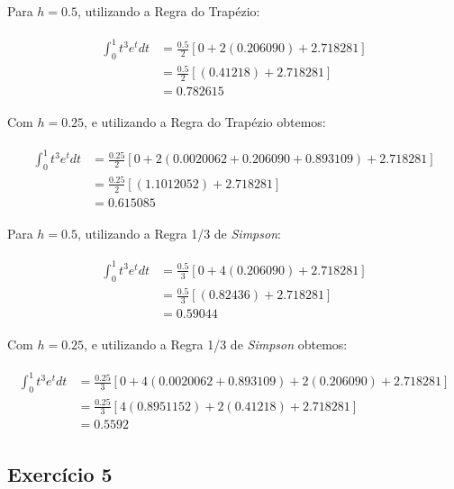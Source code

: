 \documentclass[paper=a4, fontsize=12pt]{scrartcl}
\numberwithin{equation}{section} %
\numberwithin{figure}{section} %
\numberwithin{table}{section} %
\newcommand{\euler}{e}
\begin{document}
		Para $h = 0.5$, utilizando a Regra do Trapézio:


		\begin{align*}
			\begin{split}
				\int_{0}^{1} t^{3}\euler^{t} dt &= \frac{0.5}{2}\left[0 + 2(0.206090) + 2.718281 \right]\\ &=  \frac{0.5}{2}\left[(0.41218) + 2.718281 \right] \\
				&= 0.782615
			\end{split}
		\end{align*}

		Com $h = 0.25$, e utilizando a Regra do Trapézio obtemos:

		\begin{align*}
			\begin{split}
				\int_{0}^{1} t^{3}\euler^{t} dt &= \frac{0.25}{2}\left[0 + 2(0.0020062 + 0.206090 + 0.893109) + 2.718281 \right]\\ &=  \frac{0.25}{2}\left[(1.1012052) + 2.718281 \right] \\
				&= 0.615085
			\end{split}
		\end{align*}

		Para $h = 0.5$, utilizando a Regra 1/3 de \textit{Simpson}:


		\begin{align*}
			\begin{split}
				\int_{0}^{1} t^{3}\euler^{t} dt &= \frac{0.5}{3}\left[0 + 4(0.206090) + 2.718281 \right]\\ &=  \frac{0.5}{3}\left[(0.82436) + 2.718281 \right] \\
				&= 0.59044
			\end{split}
		\end{align*}

		Com $h = 0.25$, e utilizando a Regra 1/3 de \textit{Simpson} obtemos:

		\begin{align*}
			\begin{split}
				\int_{0}^{1} t^{3}\euler^{t} dt &= \frac{0.25}{3}\left[0 + 4(0.0020062 + 0.893109) + 2(0.206090) + 2.718281 \right]\\ &=  \frac{0.25}{3}\left[4(0.8951152) + 2(0.41218) + 2.718281 \right] \\
				&= 0.5592
			\end{split}
		\end{align*}

		\subsection{Exercício 5}
\end{document}
